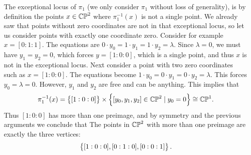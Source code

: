 \documentclass[11pt, a4paper]{article}
\begin{document}
\begin{solution}
  The exceptional locus of $\pi_1$ (we only consider $\pi_1$ without loss of generality),
  is by definition the points $x \in \mathbb{CP}^2$ where $\pi_1^{-1}(x)$ is not a single
  point.
  We already saw that points without zero coordinates are not in that exceptional
  locus, so let us consider points with exactly one coordinate zero.
  Consider for example $x = [0 : 1 : 1]$.
  The equations are $0 \cdot y_0 = 1 \cdot y_1 = 1 \cdot y_2 = \lambda$.
  Since $\lambda = 0$, we must have $y_1 = y_2 = 0$,
  which forces $y = [1 : 0 : 0]$, which is a single point,
  and thus $x$ is not in the exceptional locus.
  Next consider a point with two zero coordinates such as $x = [1 : 0 : 0]$.
  The equations become $1 \cdot y_0 = 0 \cdot y_1 = 0 \cdot y_2 = \lambda$.
  This forces $y_0 = \lambda = 0$.
  However, $y_1$ and $y_2$ are free and can be anything.
  This implies that
  \[
    \pi_1^{-1}(x) =
    \left\{[1 : 0 : 0]\right\} \times \left\{[y_0,y_1,y_2] \in \mathbb{CP}^2 \mid y_0 = 0\right\} \cong \mathbb{CP}^1.
  \]
  Thus $[1 : 0 : 0]$ has more than one preimage,
  and by symmetry and the previous arguments we conclude that
  The points in $\mathbb{CP}^2$ with more than one preimage are exactly
  the three vertices:
  \[
    \left\{[1 : 0 : 0], [0 : 1 : 0], [0 : 0 : 1]\right\}.
  \]
\end{solution}
\end{document}
